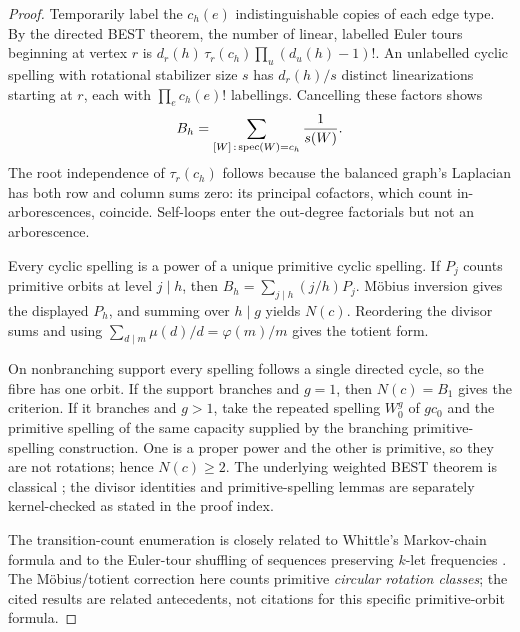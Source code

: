 \begin{proof}
Temporarily label the $c_h(e)$ indistinguishable copies of each
edge type. By the directed BEST theorem, the number of linear,
labelled Euler tours beginning at vertex $r$ is
$d_r(h)\,\tau_r(c_h)\prod_u(d_u(h)-1)!$.
An unlabelled cyclic spelling with rotational stabilizer size
$s$ has $d_r(h)/s$ distinct linearizations starting at $r$,
each with $\prod_e c_h(e)!$ labellings. Cancelling these
factors shows
\[
 B_h=\sum_{[W]\,:\,\operatorname{spec}(W)=c_h}\frac{1}{s(W)}.
\]
The root independence of $\tau_r(c_h)$ follows because the
balanced graph's Laplacian has both row and column sums zero:
its principal cofactors, which count in-arborescences, coincide.
Self-loops enter the out-degree factorials but not an
arborescence.

Every cyclic spelling is a power of a unique primitive cyclic
spelling. If $P_j$ counts primitive orbits at level $j\mid h$,
then $B_h=\sum_{j\mid h}(j/h)P_j$. M\"obius inversion gives
the displayed $P_h$, and summing over $h\mid g$ yields $N(c)$.
Reordering the divisor sums and using
$\sum_{d\mid m}\mu(d)/d=\varphi(m)/m$ gives the totient form.

On nonbranching support every spelling follows a single directed
cycle, so the fibre has one orbit. If the support branches and
$g=1$, then $N(c)=B_1$ gives the criterion.
If it branches and $g>1$, take the repeated spelling $W_0^g$
of $g c_0$ and the primitive spelling of the same capacity
supplied by the branching primitive-spelling construction.
One is a proper power and the other is primitive, so they are
not rotations; hence $N(c)\ge2$.
The underlying weighted BEST theorem is classical
\parencite{vanAardenneEhrenfest1951,jacksonGoulden1979};
the divisor identities and primitive-spelling lemmas are
separately kernel-checked as stated in the proof index.

The transition-count enumeration is closely related to
Whittle's Markov-chain formula
\parencite{whittle1955} and to the
Euler-tour shuffling of sequences preserving $k$-let
frequencies \parencite{kandel1996}.
The Möbius/totient correction here counts primitive
\emph{circular rotation classes}; the cited results
are related antecedents, not citations for this
specific primitive-orbit formula.
\end{proof}

